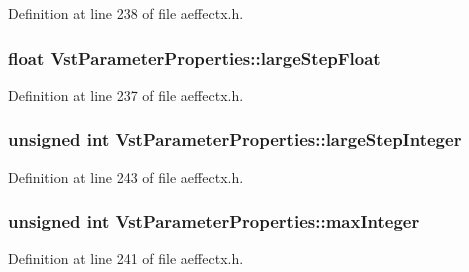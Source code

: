 Definition at line 238 of file aeffectx.\+h.

\subsubsection[{\texorpdfstring{large\+Step\+Float}{largeStepFloat}}]{\setlength{\rightskip}{0pt plus 5cm}float Vst\+Parameter\+Properties\+::large\+Step\+Float}\hypertarget{class_vst_parameter_properties_ac15a8208d47984575535639ee66afd6e}{}\label{class_vst_parameter_properties_ac15a8208d47984575535639ee66afd6e}


Definition at line 237 of file aeffectx.\+h.

\subsubsection[{\texorpdfstring{large\+Step\+Integer}{largeStepInteger}}]{\setlength{\rightskip}{0pt plus 5cm}unsigned {\bf int} Vst\+Parameter\+Properties\+::large\+Step\+Integer}\hypertarget{class_vst_parameter_properties_a6c2bbd7e292beee2c63ce2b6fb9d51f5}{}\label{class_vst_parameter_properties_a6c2bbd7e292beee2c63ce2b6fb9d51f5}


Definition at line 243 of file aeffectx.\+h.

\subsubsection[{\texorpdfstring{max\+Integer}{maxInteger}}]{\setlength{\rightskip}{0pt plus 5cm}unsigned {\bf int} Vst\+Parameter\+Properties\+::max\+Integer}\hypertarget{class_vst_parameter_properties_a03b8193288ab7dc479fc04cad65be121}{}\label{class_vst_parameter_properties_a03b8193288ab7dc479fc04cad65be121}


Definition at line 241 of file aeffectx.\+h.

